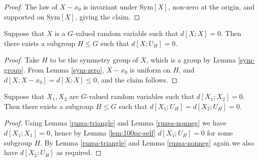 \begin{proof}\leanok  The law of $X-x_0$ is invariant under $\mathrm{Sym}[X]$, non-zero at the origin, and supported on  $\mathrm{Sym}[X]$, giving the claim.
\end{proof}


\begin{lemma}\label{lem:100pc-self}
  \leanok
  Suppose that $X$ is a $G$-valued random variable such that
  $d[X;X]=0$. Then there exists a subgroup $H \leq G$ such that $d[X;U_H] = 0$.
\end{lemma}

\begin{proof}\leanok
Take $H$ to be the symmetry group of $X$, which is a group by Lemma \ref{sym-group}. From Lemma \ref{sym-zero}, $X-x_0$ is uniform on $H$, and $d[X;X-x_0] = d[X;X] \leq 0$, and the claim follows.
\end{proof}

\begin{corollary}\label{lem:100pc}
  \leanok
  Suppose that $X_1,X_2$ are $G$-valued random variables such that
  $d[X_1;X_2]=0$. Then there exists a subgroup $H \leq G$ such that $d[X_1;U_H] = d[X_2;U_H] = 0$.
\end{corollary}

\begin{proof}\leanok
Using Lemma \ref{ruzsa-triangle} and Lemma \ref{ruzsa-nonneg} we have $d[X_1;X_1]=0$, hence by Lemma \ref{lem:100pc-self} $d[X_1;U_H]=0$ for some subgroup $H$.  By Lemma \ref{ruzsa-triangle} and Lemma \ref{ruzsa-nonneg} again we also have $d[X_2;U_H]$ as required.
\end{proof}
